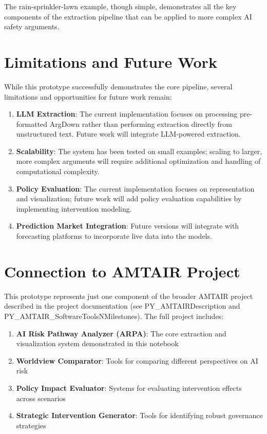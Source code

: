 \documentclass[
  11pt,
  letterpaper,
]{book}
\providecommand{\tightlist}{%
  \setlength{\itemsep}{0pt}\setlength{\parskip}{0pt}}
\begin{document}
The rain-sprinkler-lawn example, though simple, demonstrates all the key
components of the extraction pipeline that can be applied to more
complex AI safety arguments.

\section{Limitations and Future Work}\label{limitations-and-future-work}

While this prototype successfully demonstrates the core pipeline,
several limitations and opportunities for future work remain:

\begin{enumerate}
\def\labelenumi{\arabic{enumi}.}
\item
  \textbf{LLM Extraction}: The current implementation focuses on
  processing pre-formatted ArgDown rather than performing extraction
  directly from unstructured text. Future work will integrate
  LLM-powered extraction.
\item
  \textbf{Scalability}: The system has been tested on small examples;
  scaling to larger, more complex arguments will require additional
  optimization and handling of computational complexity.
\item
  \textbf{Policy Evaluation}: The current implementation focuses on
  representation and visualization; future work will add policy
  evaluation capabilities by implementing intervention modeling.
\item
  \textbf{Prediction Market Integration}: Future versions will integrate
  with forecasting platforms to incorporate live data into the models.
\end{enumerate}

\section{Connection to AMTAIR
Project}\label{connection-to-amtair-project}

This prototype represents just one component of the broader AMTAIR
project described in the project documentation (see
PY\_AMTAIRDescription and PY\_AMTAIR\_SoftwareToolsNMilestones). The
full project includes:

\begin{enumerate}
\def\labelenumi{\arabic{enumi}.}
\tightlist
\item
  \textbf{AI Risk Pathway Analyzer (ARPA)}: The core extraction and
  visualization system demonstrated in this notebook
\item
  \textbf{Worldview Comparator}: Tools for comparing different
  perspectives on AI risk
\item
  \textbf{Policy Impact Evaluator}: Systems for evaluating intervention
  effects across scenarios
\item
  \textbf{Strategic Intervention Generator}: Tools for identifying
  robust governance strategies
\end{enumerate}
\end{document}
